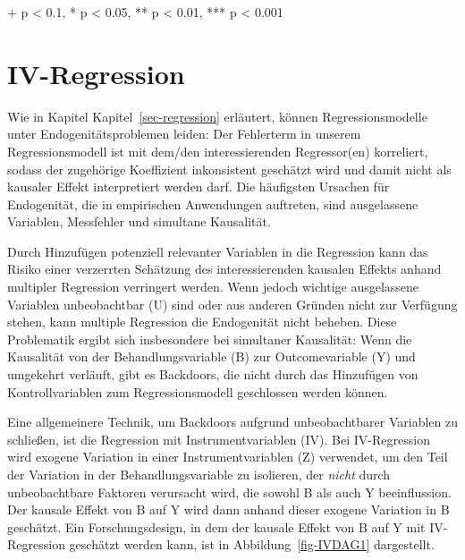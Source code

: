 \documentclass[
  a4paper,
  DIV=11,
  oneside]{scrreprt}
\begin{document}
\begin{minipage}{\linewidth}
+ p < 0.1, * p < 0.05, ** p < 0.01, *** p < 0.001\\
\end{minipage}
\endgroup


\chapter{IV-Regression}\label{sec-IV}

Wie in Kapitel Kapitel~\ref{sec-regression} erläutert, können
Regressionsmodelle unter Endogenitätsproblemen leiden: Der Fehlerterm in
unserem Regressionsmodell ist mit dem/den interessierenden Regressor(en)
korreliert, sodass der zugehörige Koeffizient inkonsistent geschätzt
wird und damit nicht als kausaler Effekt interpretiert werden darf. Die
häufigsten Ursachen für Endogenität, die in empirischen Anwendungen
auftreten, sind ausgelassene Variablen, Messfehler und simultane
Kausalität.

Durch Hinzufügen potenziell relevanter Variablen in die Regression kann
das Risiko einer verzerrten Schätzung des interessierenden kausalen
Effekts anhand multipler Regression verringert werden. Wenn jedoch
wichtige ausgelassene Variablen unbeobachtbar (U) sind oder aus anderen
Gründen nicht zur Verfügung stehen, kann multiple Regression die
Endogenität nicht beheben. Diese Problematik ergibt sich insbesondere
bei simultaner Kausalität: Wenn die Kausalität von der
Behandlungsvariable (B) zur Outcomevariable (Y) und umgekehrt verläuft,
gibt es Backdoors, die nicht durch das Hinzufügen von Kontrollvariablen
zum Regressionsmodell geschlossen werden können.

Eine allgemeinere Technik, um Backdoors aufgrund unbeobachtbarer
Variablen zu schließen, ist die Regression mit Instrumentvariablen (IV).
Bei IV-Regression wird exogene Variation in einer Instrumentvariablen
(Z) verwendet, um den Teil der Variation in der Behandlungsvariable zu
isolieren, der \emph{nicht} durch unbeobachtbare Faktoren verursacht
wird, die sowohl B als auch Y beeinflussion. Der kausale Effekt von B
auf Y wird dann anhand dieser exogene Variation in B geschätzt. Ein
Forschungsdesign, in dem der kausale Effekt von B auf Y mit
IV-Regression geschätzt werden kann, ist in Abbildung~\ref{fig-IVDAG1}
dargestellt.
\end{document}
